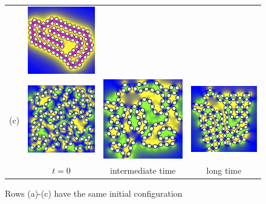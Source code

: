 \begin{figure}[h]
\begin{center}
\begin{tabular}{m{0.1cm}m{1.8in}m{1.8in}m{1.8in}}
      &\includegraphics[width=1.8in]{figures/SpecificAim1/N100C3.jpg}    \\
    (c)
      &\includegraphics[width=1.8in]{figures/SpecificAim1/N100A1.jpg}
      &\includegraphics[width=1.8in]{figures/SpecificAim1/N100A2.jpg}
      &\includegraphics[width=1.8in]{figures/SpecificAim1/N100A3.jpg}    \\
      &\multicolumn{1}{c}{$t = 0$}
      &\multicolumn{1}{c}{intermediate time}
      &\multicolumn{1}{c}{long time}
  \end{tabular}
  \end{center}
  \vspace{-20pt}
  \caption{\footnotesize
    \label{fig:self-assembly}
    Rows (a)-(c) have the same initial configuration
}
\end{figure}

